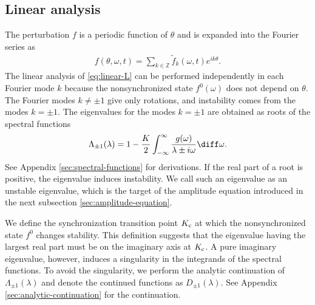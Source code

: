 \subsection{Linear analysis}
\label{eq:linear-eigenvalues}

The perturbation $f$ is a periodic function of $\theta$
and is expanded into the Fourier series as
\begin{align}
  f(\theta,\omega,t)
  = \sum_{k\in\mathbb{Z}} \widetilde{f}_{k}(\omega,t) e^{ik\theta}.
  \label{eq:f-Fourier}
\end{align}
The linear analysis of \eqref{eq:linear-L}
can be performed independently in each Fourier mode $k$
because the nonsynchronized state $f^{0}(\omega)$ does not depend on $\theta$.
The Fourier modes $k\neq \pm 1$ give only rotations,
and instability comes from the modes $k=\pm 1$.
The eigenvalues for the modes $k=\pm 1$ are obtained
as roots of the spectral functions
\begin{align}
  \Lambda_{\pm 1}(\lambda)
  = 1 - \frac{K}{2} \int_{-\infty}^{\infty}
  \frac{g(\omega)}{\lambda\pm i\omega} \diff\omega.
  \label{eq:spectral-function}
\end{align}
See Appendix \ref{sec:spectral-functions} for derivations.
If the real part of a root is positive, the eigenvalue induces instability.
We call such an eigenvalue as an unstable eigenvalue,
which is the target of the amplitude equation introduced
in the next subsection \ref{sec:amplitude-equation}.

We define the synchronization transition point $K_{\rm c}$
at which the nonsynchronized state $f^{0}$ changes stability.
This definition suggests that the eigenvalue having the largest real part
must be on the imaginary axis at $K_{\rm c}$.
A pure imaginary eigenvalue, however, induces a singularity
in the integrands of the spectral functions.
To avoid the singularity, we perform the analytic continuation
of $\Lambda_{\pm 1}(\lambda)$
and denote the continued functions as $D_{\pm 1}(\lambda)$.
See Appendix \ref{sec:analytic-continuation} for the continuation.


